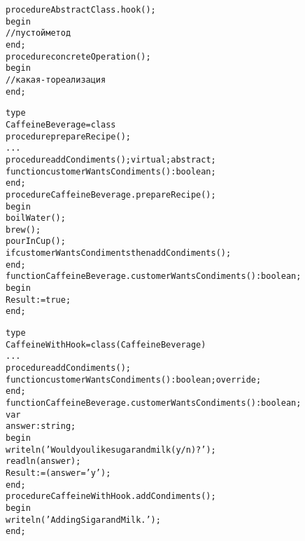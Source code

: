 \documentclass{beamer}
\begin{document}
\begin{frame}[fragile]
\begin{alltt}
procedure AbstractClass.hook();
begin
  //пустой метод
end;
procedure concreteOperation(); 
begin
  //какая-то реализация
end;
\end{alltt}
\end{frame}

\begin{frame}[fragile]
\begin{alltt}
type
  CaffeineBeverage = class
    procedure prepareRecipe();
    ...
    procedure addCondiments(); virtual; abstract;
    function customerWantsCondiments(): boolean;
  end;
procedure CaffeineBeverage.prepareRecipe();
begin
  boilWater();
  brew();
  pourInCup();
  if customerWantsCondiments then addCondiments();
end;
function CaffeineBeverage.customerWantsCondiments(): boolean;
begin
  Result := true;
end;
\end{alltt}
\end{frame}

\begin{frame}[fragile]
\begin{alltt}
type
  CaffeineWithHook = class(CaffeineBeverage)
	...
    procedure addCondiments(); 
    function customerWantsCondiments(): boolean; override;
  end;
function CaffeineBeverage.customerWantsCondiments(): boolean;
var
  answer: string;
begin
  writeln('Would you like sugar and milk (y/n)?');  
  readln(answer);
  Result := (answer='y');
end;
procedure CaffeineWithHook.addCondiments(); 
begin
  writeln('Adding Sigar and Milk.');
end;
\end{alltt}
\end{frame}
\end{document}
